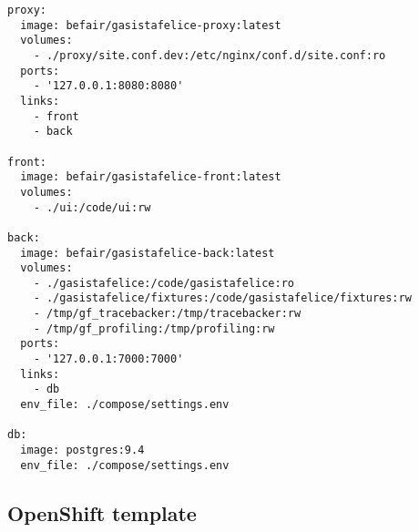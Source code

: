 \begin{verbatim}
proxy:
  image: befair/gasistafelice-proxy:latest
  volumes:
    - ./proxy/site.conf.dev:/etc/nginx/conf.d/site.conf:ro
  ports:
    - '127.0.0.1:8080:8080'
  links:
    - front
    - back

front:
  image: befair/gasistafelice-front:latest
  volumes:
    - ./ui:/code/ui:rw

back:
  image: befair/gasistafelice-back:latest
  volumes:
    - ./gasistafelice:/code/gasistafelice:ro
    - ./gasistafelice/fixtures:/code/gasistafelice/fixtures:rw
    - /tmp/gf_tracebacker:/tmp/tracebacker:rw
    - /tmp/gf_profiling:/tmp/profiling:rw
  ports:
    - '127.0.0.1:7000:7000'
  links:
    - db
  env_file: ./compose/settings.env

db:
  image: postgres:9.4
  env_file: ./compose/settings.env
\end{verbatim}

\subsection{OpenShift template}\label{openshift-template}

